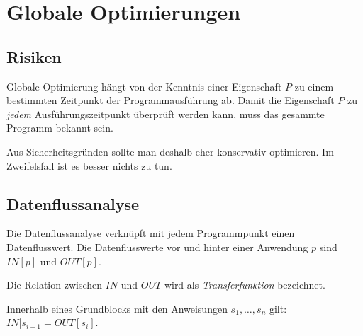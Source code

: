 \section{Globale Optimierungen}

\subsection{Risiken}

Globale Optimierung hängt von der Kenntnis einer Eigenschaft $P$ zu einem
bestimmten Zeitpunkt der Programmausführung ab. Damit die Eigenschaft $P$ zu
\textit{jedem} Ausführungszeitpunkt überprüft werden kann, muss das gesammte
Programm bekannt sein.

Aus Sicherheitsgründen sollte man deshalb eher konservativ optimieren. Im
Zweifelsfall ist es besser nichts zu tun.

\subsection{Datenflussanalyse}

Die Datenflussanalyse verknüpft mit jedem Programmpunkt einen Datenflusswert.
Die Datenflusswerte vor und hinter einer Anwendung $p$ sind $IN[p]$ und
$OUT[p]$.

Die Relation zwischen $IN$ und $OUT$ wird als \textit{Transferfunktion}
bezeichnet.

Innerhalb eines Grundblocks mit den Anweisungen $s_1,\ldots,s_n$ gilt:
$IN[s_{i+1} = OUT[s_i]$.
